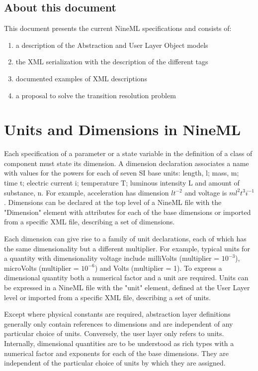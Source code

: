\documentclass[draftspec]{ninemlspec}
\begin{document}
\subsection{About this document}

This document presents the current NineML specifications and consists of:
\begin{enumerate}
\item a description of the Abstraction and User Layer Object models
\item the XML serialization with the description of the different tags
\item documented examples of XML descriptions
\item a proposal to solve the transition resolution problem
\end{enumerate}

\section{Units and Dimensions in NineML}
\label{dimensions}

\noindent
Each specification of a parameter or a state variable in the definition of
a class of component must state its dimension. A dimension declaration
associates a name with values for the powers for each of seven SI base
units: length, l; mass, m; time t; electric current i; temperature T;
luminous intensity L and amount of substance, n.
For example, acceleration has dimension $lt^{-2}$ and voltage is
$ml^2t^3i^{-1}$.
Dimensions can be declared at the top level of a NineML file with
the "Dimension" element with attributes for each of the base dimensions or
imported from a specific XML file, describing a set of dimensions.

Each dimension can give rise to a family of unit declarations, each of
which has the same dimensionality but a different multiplier. For example,
typical units for a quantity with dimensionality voltage include
milliVolts (multiplier = $10^{-3}$), microVolts (multiplier = $10^{-6}$)
and Volts (multiplier = 1).  To express a dimensional quantity both a
numerical factor and a unit are required. Units can be expressed in a NineML
file with the "unit" element, defined at the User Layer level or imported
from a specific XML file, describing a set of units.

Except where physical constants are required, abstraction layer definitions
generally only contain references to dimensions and are independent of any
particular choice of units. Conversely, the user layer only refers to units.
Internally, dimensional quantities are to be understood
as rich types with a numerical factor and exponents for each of the
base dimensions. They are independent of the particular choice of
units by which they are assigned.
\end{document}
